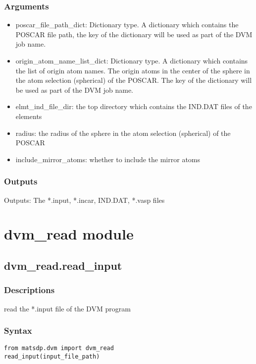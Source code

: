 \documentclass[12pt]{book}
\begin{document}
\subsubsection{Arguments}
\begin{itemize}
\item poscar\_file\_path\_dict: Dictionary type. A dictionary which contains the POSCAR file path, the key of the dictionary will be used as part of the DVM job name.
\item origin\_atom\_name\_list\_dict: Dictionary type. A dictionary which contains the list of origin atom names. The origin atoms in the center of the sphere in the atom selection (spherical) of the POSCAR. The key of the dictionary will be used as part of the DVM job name.
\item elmt\_ind\_file\_dir: the top directory which contains the IND.DAT files of the elements
\item radius: the radius of the sphere in the atom selection (spherical) of the POSCAR
\item include\_mirror\_atoms: whether to include the mirror atoms
\end{itemize}

\subsubsection{Outputs}
Outputs: The *.input, *.incar, IND.DAT, *.vasp files


\section{dvm\_read module}

\subsection{dvm\_read.read\_input}

\subsubsection{Descriptions}
read the *.input file of the DVM program
\subsubsection{Syntax}
\begin{lstlisting}
from matsdp.dvm import dvm_read
read_input(input_file_path)
\end{lstlisting}
\end{document}
